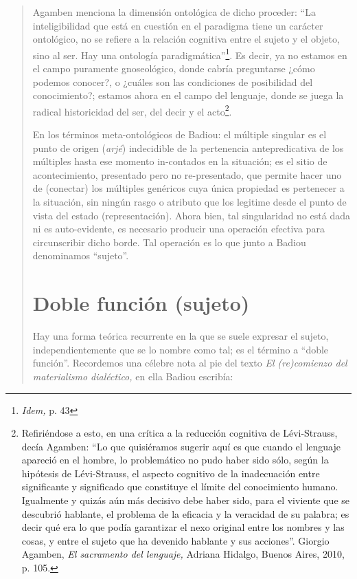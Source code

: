 \begin{quote}
Agamben menciona la dimensión ontológica de dicho proceder: \enquote{La inteligibilidad que está en cuestión en el paradigma tiene un carácter ontológico, no se refiere a la relación cognitiva entre el sujeto y el objeto, sino al ser. Hay una ontología paradigmática}\footnote{\emph{Idem,} p. 43}. Es decir, ya no estamos en el campo puramente gnoseológico, donde cabría preguntarse ¿cómo podemos conocer?, o ¿cuáles son las condiciones de posibilidad del conocimiento?; estamos ahora en el campo del lenguaje, donde se juega la radical historicidad del ser, del decir y el acto\footnote{Refiriéndose a esto, en una crítica a la reducción cognitiva de Lévi-Strauss, decía Agamben: \enquote{Lo que quisiéramos sugerir aquí es que cuando  el lenguaje apareció en el hombre, lo problemático no pudo haber sido sólo, según la hipótesis de Lévi-Strauss, el aspecto cognitivo de la inadecuación entre significante y significado que constituye el límite del conocimiento humano. Igualmente y quizás aún más decisivo debe haber sido, para el viviente que se descubrió hablante, el problema de la eficacia y la veracidad de su palabra; es decir qué era lo que podía garantizar el nexo original entre los nombres y las cosas, y entre el sujeto que ha devenido hablante  y sus acciones}. Giorgio Agamben, \emph{El sacramento del lenguaje,} Adriana Hidalgo, Buenos Aires, 2010, p. 105.}.

En los términos meta-ontológicos de Badiou: el múltiple singular es el punto de origen (\emph{arjé}) indecidible de la pertenencia antepredicativa de los múltiples hasta ese momento in-contados en la situación; es el sitio de acontecimiento, presentado pero no re-presentado, que permite hacer uno de (conectar) los múltiples genéricos cuya única propiedad es pertenecer a la situación, sin ningún rasgo o atributo que los legitime desde el punto de vista del estado (representación). Ahora bien, tal singularidad no está dada ni es auto-evidente, es necesario  producir una operación efectiva para circunscribir dicho borde. Tal operación es lo que junto a Badiou denominamos \enquote{sujeto}.

\section{Doble función (sujeto)}

Hay una forma teórica recurrente en la que se suele expresar el sujeto, independientemente que se lo nombre como tal; es el término a \enquote{doble función}. Recordemos una célebre nota al pie del texto \emph{El (re)comienzo del materialismo dialéctico,} en ella Badiou escribía:


\end{quote}
